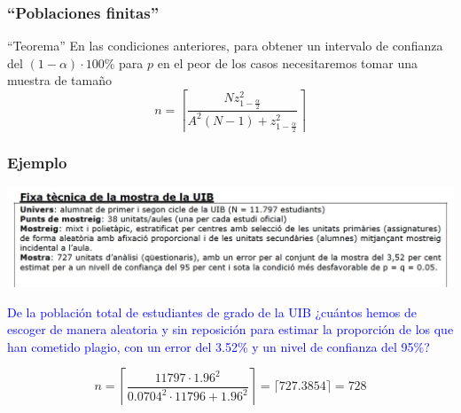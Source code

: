 \documentclass[12pt,t]{beamer}
\newcommand{\blue}[1]{\textcolor{blue}{#1}}
\theoremstyle{plain}
\theoremstyle{definition}
\begin{document}
\begin{frame}
\frametitle{``Poblaciones finitas''}

\begin{block}{``Teorema''}
En las condiciones anteriores, para obtener un intervalo de confianza  del $(1-\alpha)\cdot 100\%$ para $p$ en el peor de los casos necesitaremos tomar una muestra de tamaño 
$$
n=\left\lceil\frac{Nz_{1-\frac{\alpha}{2}}^2}{A^2(N-1)+z_{1-\frac{\alpha}{2}}^2}\right\rceil
$$
\end{block}
\end{frame}

\begin{frame}
\frametitle{Ejemplo}
\vspace*{-5ex}

\begin{center}
\hspace*{-0.5cm}\includegraphics[width=1.1\linewidth]{plagiUIB2.jpg}
\end{center}

\blue{De la población total de estudiantes de grado de la UIB ¿cuántos hemos de escoger de manera aleatoria  y sin  reposición para estimar la proporción de los que han cometido plagio, con un error del 3.52\% y un nivel de confianza  del 95\%?}

$$
n=\left\lceil\frac{11797\cdot 1.96^2}{0.0704^2\cdot 11796+1.96^2}\right\rceil=\lceil 727.3854\rceil=728
$$
\end{frame}
\end{document}
